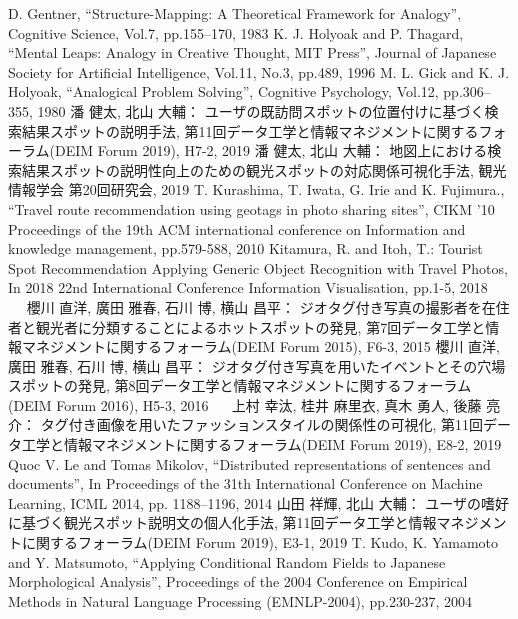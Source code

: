 \documentclass{deimj}
\begin{document}
\vspace{2em}
\begin{thebibliography}{99}
    D. Gentner,
      ``Structure-Mapping: A Theoretical Framework for Analogy'',
      Cognitive Science, Vol.7, pp.155–170, 1983
    K. J. Holyoak and P. Thagard,
      ``Mental Leaps: Analogy in Creative Thought, MIT Press'',
      Journal of Japanese Society for Artificial Intelligence,  Vol.11, No.3,  pp.489, 1996
    M. L. Gick and K. J. Holyoak,
      ``Analogical Problem Solving'',
      Cognitive Psychology, Vol.12, pp.306–355, 1980
    潘 健太, 北山 大輔：
      ユーザの既訪問スポットの位置付けに基づく検索結果スポットの説明手法,
      第11回データ工学と情報マネジメントに関するフォーラム(DEIM Forum 2019), H7-2, 2019
    潘 健太, 北山 大輔：
      地図上における検索結果スポットの説明性向上のための観光スポットの対応関係可視化手法,
      観光情報学会 第20回研究会, 2019
    T. Kurashima, T. Iwata, G. Irie and K. Fujimura.,
      ``Travel route recommendation using geotags in photo sharing sites'',
      CIKM '10 Proceedings of the 19th ACM international conference on Information and knowledge management, pp.579-588, 2010
    Kitamura, R. and Itoh, T.:
      Tourist Spot Recommendation Applying Generic Object Recognition with Travel Photos,
      In 2018 22nd International Conference Information Visualisation, pp.1-5, 2018
    櫻川 直洋, 廣田 雅春, 石川 博, 横山 昌平：
      ジオタグ付き写真の撮影者を在住者と観光者に分類することによるホットスポットの発見,
      第7回データ工学と情報マネジメントに関するフォーラム(DEIM Forum 2015), F6-3, 2015
    櫻川 直洋, 廣田 雅春, 石川 博, 横山 昌平：
      ジオタグ付き写真を用いたイベントとその穴場スポットの発見,
      第8回データ工学と情報マネジメントに関するフォーラム(DEIM Forum 2016), H5-3, 2016
    上村 幸汰, 桂井 麻里衣, 真木 勇人, 後藤 亮介：
      タグ付き画像を用いたファッションスタイルの関係性の可視化,
      第11回データ工学と情報マネジメントに関するフォーラム(DEIM Forum 2019), E8-2, 2019
    Quoc V. Le and Tomas Mikolov,
      ``Distributed representations of sentences and documents'',
      In Proceedings of the 31th International Conference on Machine Learning, ICML 2014, pp. 1188–1196, 2014
    山田 祥輝, 北山 大輔：
      ユーザの嗜好に基づく観光スポット説明文の個人化手法,
      第11回データ工学と情報マネジメントに関するフォーラム(DEIM Forum 2019), E3-1, 2019
    T. Kudo, K. Yamamoto and Y. Matsumoto,
      ``Applying Conditional Random Fields to Japanese Morphological Analysis'',
      Proceedings of the 2004 Conference on Empirical Methods in Natural Language Processing (EMNLP-2004), pp.230-237, 2004
\end{thebibliography}
\end{document}
